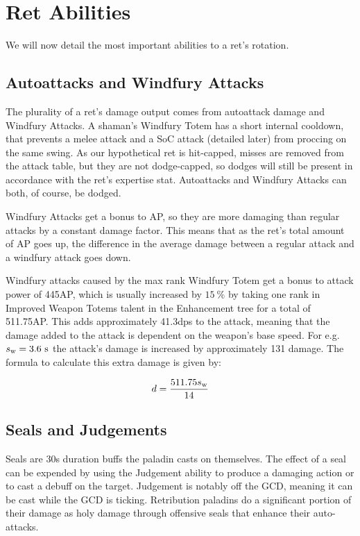 \documentclass[letterpaper,11pt]{article}
\begin{document}
	\section{Ret Abilities}
	We will now detail the most important abilities to a ret's rotation.

	\subsection{Autoattacks and Windfury Attacks}
	The plurality of a ret's damage output comes from autoattack damage and Windfury Attacks.
	A shaman's Windfury Totem has a short internal cooldown, that prevents a melee attack and a SoC attack (detailed later) from proccing on the same swing.
	As our hypothetical ret is hit-capped, misses are removed from the attack table, but they are
	not dodge-capped, so dodges will still be present in accordance with the ret's expertise stat.
	Autoattacks and Windfury Attacks can both, of course, be dodged.
	
	Windfury Attacks get a bonus to AP, so they are more damaging than regular attacks by a constant damage factor.
	This means that as the ret's total amount of AP goes up, the difference in the average damage between a regular attack and a windfury attack goes down.
	
	Windfury attacks caused by the max rank Windfury Totem get a bonus to attack power of 445AP, which is usually increased by $15~\%$ by taking one rank in Improved Weapon Totems talent in the Enhancement tree for a total of 511.75AP.
	This adds approximately 41.3dps to the attack, meaning that the damage added to the attack is dependent on the weapon's base speed.
	For e.g. $s_\mathrm{w}  = 3.6~\mathrm{s}$ the attack's damage is increased by approximately 131 damage.
	The formula to calculate this extra damage is given by:
	
	\begin{equation}
		d = \frac{511.75 s_\mathrm{w} }{14}
	\end{equation}
	
	\subsection{Seals and Judgements}
	Seals are 30s duration buffs the paladin casts on themselves.
	The effect of a seal can be expended by using the Judgement ability to produce a damaging action or to cast a debuff on the target.
	Judgement is notably off the GCD, meaning it can be cast while the GCD is ticking.
	Retribution paladins do a significant portion of their damage as holy damage through offensive seals that enhance their auto-attacks.
\end{document}
